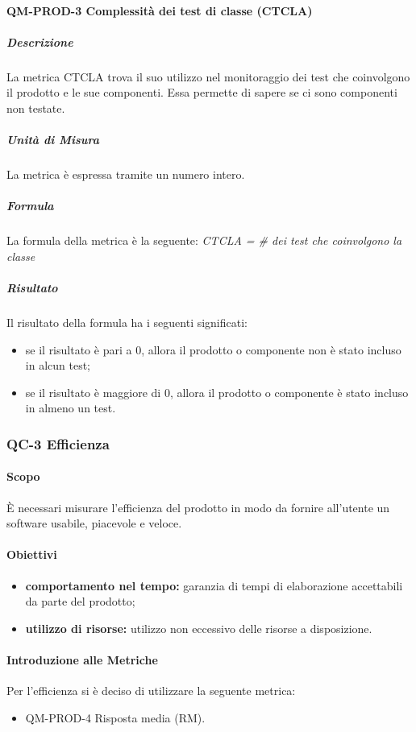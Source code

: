 			\paragraph{QM-PROD-3 Complessità dei test di classe (CTCLA)}
				\subparagraph{Descrizione}
					La metrica CTCLA trova il suo utilizzo nel monitoraggio dei test che coinvolgono il prodotto e le sue componenti. Essa permette di sapere se ci sono componenti non testate.
				\subparagraph{Unità di Misura}
					La metrica è espressa tramite un numero intero.
				\subparagraph{Formula}
					La formula della metrica è la seguente:
					\textit{CTCLA = \# dei test che coinvolgono la classe}
				\subparagraph{Risultato}
					Il risultato della formula ha i seguenti significati:
					\begin{itemize}
						\item se il risultato è pari a 0, allora il prodotto o componente non è stato incluso in alcun test;
						\item se il risultato è maggiore di 0, allora il prodotto o componente è stato incluso in almeno un test.
					\end{itemize}

		\subsubsection{QC-3 Efficienza}
			\paragraph{Scopo}
				È necessari misurare l'efficienza del prodotto in modo da fornire all'utente un software usabile, piacevole e veloce.
				\paragraph{Obiettivi}
					\begin{itemize}
						\item \textbf{comportamento nel tempo:} garanzia di tempi di elaborazione accettabili da parte del prodotto;
						\item \textbf{utilizzo di risorse:} utilizzo non eccessivo delle risorse a disposizione.
					\end{itemize}
			\paragraph{Introduzione alle Metriche}
				Per l'efficienza si è deciso di utilizzare la seguente metrica:
				\begin{itemize}
					\item QM-PROD-4 Risposta media (RM).
				\end{itemize}
